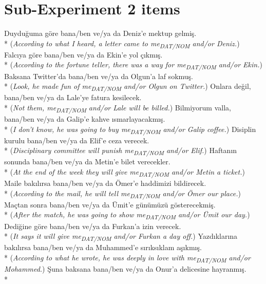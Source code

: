 \section{Sub-Experiment 2 items}

\ea Duydu\u{g}uma g\"{o}re bana/ben ve/ya da Deniz'e mektup gelmi\c{s}. \\*
({\it According to what I heard, a letter came to me\textsubscript{DAT/NOM} and/or Deniz.})
\ex Falc{\i}ya g\"{o}re bana/ben ve/ya da Ekin'e yol \c{c}{\i}km{\i}\c{s}. \\*
({\it According to the fortune teller, there was a way for me\textsubscript{DAT/NOM} and/or Ekin.})
\ex Baksana Twitter'da bana/ben ve/ya da Olgun'a laf sokmu\c{s}. \\*
({\it Look, he made fun of me\textsubscript{DAT/NOM} and/or Olgun on Twitter.})
\ex Onlara de\u{g}il, bana/ben ve/ya da Lale'ye fatura kesilecek. \\*
({\it Not them, me\textsubscript{DAT/NOM} and/or Lale will be billed.})
\ex Bilmiyorum valla, bana/ben ve/ya da Galip'e kahve {\i}smarlayacakm{\i}\c{s}. \\*
({\it I don't know, he was going to buy me\textsubscript{DAT/NOM} and/or Galip coffee.})
\ex Disiplin kurulu bana/ben ve/ya da Elif'e ceza verecek. \\*
({\it Disciplinary committee will punish me\textsubscript{DAT/NOM} and/or Elif.})
\ex Haftan{\i}n sonunda bana/ben ve/ya da Metin'e bilet verecekler. \\*
({\it At the end of the week they will give me\textsubscript{DAT/NOM} and/or Metin a ticket.})
\ex Maile bak{\i}l{\i}rsa bana/ben ve/ya da \"{O}mer'e haddimizi bildirecek. \\*
({\it According to the mail, he will tell me\textsubscript{DAT/NOM} and/or Ömer our place.})
\ex Ma\c{c}tan sonra bana/ben ve/ya da \"{U}mit'e g\"{u}n\"{u}m\"{u}z\"{u} g\"{o}sterecekmi\c{s}. \\*
({\it After the match, he was going to show me\textsubscript{DAT/NOM} and/or Ümit our day.})
\ex Dedi\u{g}ine g\"{o}re bana/ben ve/ya da Furkan'a izin verecek. \\*
({\it It says it will give me\textsubscript{DAT/NOM} and/or Furkan a day off.})
\ex Yazd{\i}klar{\i}na bak{\i}l{\i}rsa bana/ben ve/ya da Muhammed'e s{\i}r{\i}ks{\i}klam a\c{s}{\i}km{\i}\c{s}. \\*
({\it According to what he wrote, he was deeply in love with me\textsubscript{DAT/NOM} and/or Mohammed.})
\ex \c{S}una baksana bana/ben ve/ya da Onur'a delicesine hayranm{\i}\c{s}. \\*
